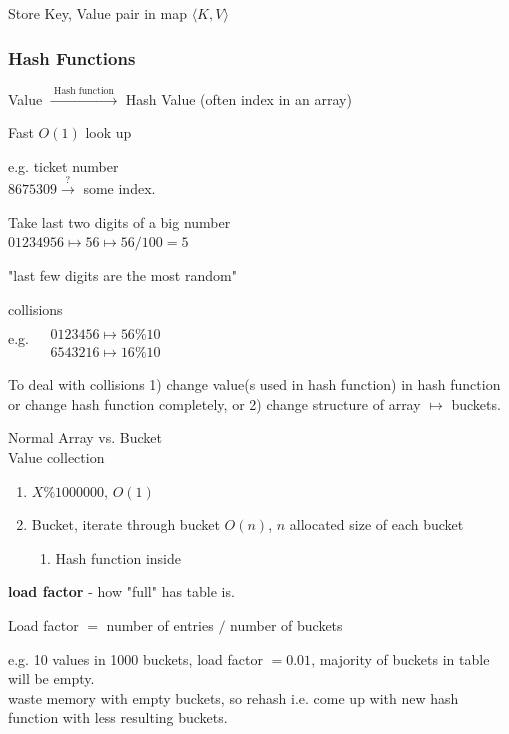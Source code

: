 \documentclass[10pt]{amsart}
\begin{document}
Store Key, Value pair in map $\langle K, V \rangle$

\subsubsection{Hash Functions}

Value $\xrightarrow{ \text{ Hash function } }$ Hash Value (often index in an array)

Fast $O(1)$ look up

e.g. ticket number  \\
$8675309 \xrightarrow{?} $ some index.

Take last two digits of a big number \\
$01234956 \mapsto 56 \mapsto 56/100 = 5$

"last few digits are the most random"

collisions \\
e.g. 
$\begin{aligned} 
	& \quad \\ 
	& 0123456 \mapsto 56 \% 10 \\
	& 6543216 \mapsto 16 \% 10 \end{aligned}$ 

To deal with collisions
1) change value(s used in hash function) in hash function or change hash function completely, or 2) change structure of array $\mapsto $ buckets.

Normal Array vs. Bucket \\
Value \phantom{ Array vs. } collection \\

\begin{enumerate}
	\item $ X \% 1000000$, $O(1)$ 
	\item Bucket, iterate through bucket $O(n)$, $n$ allocated size of each bucket
\begin{enumerate}
	\item  Hash function inside 
\end{enumerate}
\end{enumerate}

\textbf{load factor} - how "full" has table is.

Load factor $=$ number of entries $/$ number of buckets 

e.g. 10 values in 1000 buckets, load factor $=0.01$, majority of buckets in table will be empty. \\
waste memory with empty buckets, so rehash i.e. come up with new hash function with less resulting buckets. \\
\end{document}
